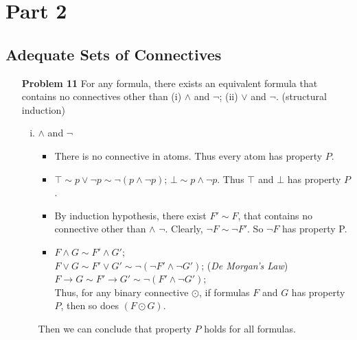 \section{Part 2}
\subsection{Adequate Sets of Connectives}
\begin{enumerate}
\item[\textbf{Problem 11}] For any formula, there exists an equivalent formula that contains no connectives other than (i) $\wedge$ and $\neg$; (ii) $\vee$ and $\neg$.  (structural induction)
    \begin{enumerate} [(i)]
        \item $\wedge$ and $\neg$ 
            \begin{itemize}
                \item There is no connective in atoms. Thus every atom has property $P$. 
                \item $\top \sim p \vee \neg p \sim \neg (p \wedge \neg p)$; $\bot \sim p \wedge \neg p$. Thus $\top$ and $\bot$ has property $P$. 
                \item By induction hypothesis, there exist $F' \sim F$, that contains no connective other than $\wedge$  $\neg$.  Clearly, $\neg F \sim \neg F'$.  So $\neg F$ has property P. 
                \item $F \wedge G \sim F' \wedge G'$; \\
                 $F \vee G \sim F' \vee G' \sim \neg (\neg F' \wedge \neg G')$; (\textit{De Morgan's Law}) \\
                 $ F \rightarrow G \sim F' \rightarrow G' \sim \neg (F' \wedge \neg G')$;\\
                  Thus, for any binary connective $\odot$, if formulas $F$ and $G$ has property $P$, then so does $(F \odot G)$. 
            \end{itemize}
       Then we can conclude that property $P$ holds for all formulas.   
       

\end{enumerate}
\end{enumerate}
